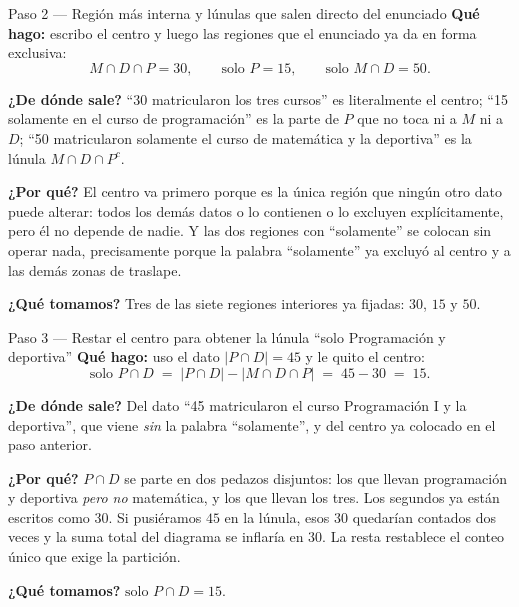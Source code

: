 \documentclass[11pt]{article}
\begin{document}
\begin{paso}{Paso 2 --- Región más interna y lúnulas que salen directo del enunciado}
\textbf{Qué hago:} escribo el centro y luego las regiones que el enunciado ya da en forma exclusiva:
\[
M\cap D\cap P = 30,\qquad \text{solo }P = 15,\qquad \text{solo } M\cap D = 50 .
\]

\textbf{¿De dónde sale?} ``30 matricularon los tres cursos'' es literalmente el centro; ``15 solamente en
el curso de programación'' es la parte de $P$ que no toca ni a $M$ ni a $D$; ``50 matricularon solamente
el curso de matemática y la deportiva'' es la lúnula $M\cap D\cap P^{c}$.

\textbf{¿Por qué?} El centro va primero porque es la única región que ningún otro dato puede alterar:
todos los demás datos o lo contienen o lo excluyen explícitamente, pero él no depende de nadie. Y las dos
regiones con ``solamente'' se colocan sin operar nada, precisamente porque la palabra ``solamente'' ya
excluyó al centro y a las demás zonas de traslape.

\textbf{¿Qué tomamos?} Tres de las siete regiones interiores ya fijadas: $30$, $15$ y $50$.
\end{paso}

\begin{paso}{Paso 3 --- Restar el centro para obtener la lúnula ``solo Programación y deportiva''}
\textbf{Qué hago:} uso el dato $|P\cap D|=45$ y le quito el centro:
\[
\text{solo } P\cap D \;=\; |P\cap D| - |M\cap D\cap P| \;=\; 45-30 \;=\; 15 .
\]

\textbf{¿De dónde sale?} Del dato ``45 matricularon el curso Programación I y la deportiva'', que viene
\emph{sin} la palabra ``solamente'', y del centro ya colocado en el paso anterior.

\textbf{¿Por qué?} $P\cap D$ se parte en dos pedazos disjuntos: los que llevan programación y deportiva
\emph{pero no} matemática, y los que llevan los tres. Los segundos ya están escritos como $30$. Si
pusiéramos $45$ en la lúnula, esos $30$ quedarían contados dos veces y la suma total del diagrama se
inflaría en $30$. La resta restablece el conteo único que exige la partición.

\textbf{¿Qué tomamos?} $\text{solo } P\cap D = 15$.
\end{paso}
\end{document}
